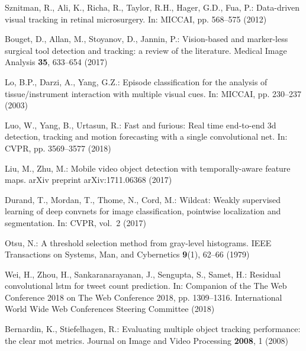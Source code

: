 \documentclass{svjour3}                     \smartqed
\begin{document}
\begin{thebibliography}{10}
Sznitman, R., Ali, K., Richa, R., Taylor, R.H., Hager, G.D., Fua, P.:
  Data-driven visual tracking in retinal microsurgery.
\newblock In: MICCAI, pp. 568--575 (2012)

Bouget, D., Allan, M., Stoyanov, D., Jannin, P.: Vision-based and marker-less
  surgical tool detection and tracking: a review of the literature.
\newblock Medical Image Analysis \textbf{35}, 633--654 (2017)

Lo, B.P., Darzi, A., Yang, G.Z.: Episode classification for the analysis of
  tissue/instrument interaction with multiple visual cues.
\newblock In: MICCAI, pp. 230--237 (2003)

Luo, W., Yang, B., Urtasun, R.: Fast and furious: Real time end-to-end 3d
  detection, tracking and motion forecasting with a single convolutional net.
\newblock In: CVPR, pp. 3569--3577 (2018)

Liu, M., Zhu, M.: Mobile video object detection with temporally-aware feature
  maps.
\newblock arXiv preprint arXiv:1711.06368  (2017)

Durand, T., Mordan, T., Thome, N., Cord, M.: Wildcat: Weakly supervised
  learning of deep convnets for image classification, pointwise localization
  and segmentation.
\newblock In: CVPR, vol.~2 (2017)

Otsu, N.: A threshold selection method from gray-level histograms.
\newblock IEEE Transactions on Systems, Man, and Cybernetics \textbf{9}(1),
  62--66 (1979)

Wei, H., Zhou, H., Sankaranarayanan, J., Sengupta, S., Samet, H.: Residual
  convolutional lstm for tweet count prediction.
\newblock In: Companion of the The Web Conference 2018 on The Web Conference
  2018, pp. 1309--1316. International World Wide Web Conferences Steering
  Committee (2018)

Bernardin, K., Stiefelhagen, R.: Evaluating multiple object tracking
  performance: the clear mot metrics.
\newblock Journal on Image and Video Processing \textbf{2008}, 1 (2008)


\end{thebibliography}
\end{document}
